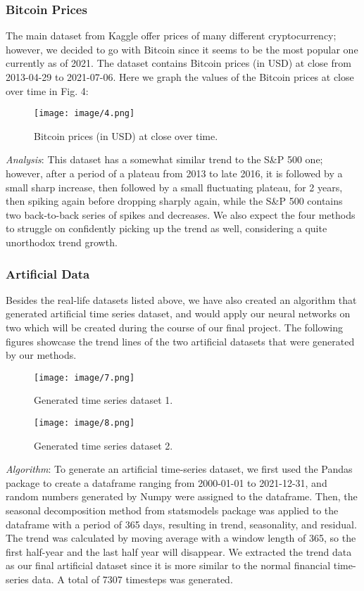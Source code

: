 \documentclass[letterpaper, 10 pt, conference]{ieeeconf}  %
\begin{document}
        \subsubsection{Bitcoin Prices} The main dataset from Kaggle offer prices of many different cryptocurrency; however, we decided to go with Bitcoin since it seems to be the most popular one currently as of 2021. The dataset contains Bitcoin prices (in USD) at close from 2013-04-29 to 2021-07-06. Here we graph the values of the Bitcoin prices at close over time in Fig. 4:

        \begin{figure}[thpb]
            \centering
              \texttt{[image: image/4.png]}
            \caption{Bitcoin prices (in USD) at close over time.}
            \label{figurelabel}
        \end{figure}

        \textit{Analysis}: This dataset has a somewhat similar trend to the S\&P 500 one; however, after a period of a plateau from 2013 to late 2016, it is followed by a small sharp increase, then followed by a small fluctuating plateau, for 2 years, then spiking again before dropping sharply again, while the S\&P 500 contains two back-to-back series of spikes and decreases. We also expect the four methods to struggle on confidently picking up the trend as well, considering a quite unorthodox trend growth.

        \subsubsection{Artificial Data} Besides the real-life datasets listed above, we have also created an algorithm that generated artificial time series dataset, and would apply our neural networks on two which will be created during the course of our final project. The following figures showcase the trend lines of the two artificial datasets that were generated by our methods.
        \begin{figure}[thpb]
            \centering
            \texttt{[image: image/7.png]}
            \caption{Generated time series dataset 1.}
            \label{figurelabel}
            \centering
            \texttt{[image: image/8.png]}
            \caption{Generated time series dataset 2.}
            \label{figurelabel}
        \end{figure}

        \textit{Algorithm}: To generate an artificial time-series dataset, we first used the Pandas package to create a dataframe ranging from 2000-01-01 to 2021-12-31,  and random numbers generated by Numpy were assigned to the dataframe. Then, the seasonal decomposition method from statsmodels package was applied to the dataframe with a period of 365 days, resulting in trend, seasonality, and residual. The trend was calculated by moving average with a window length of 365, so the first half-year and the last half year will disappear. We extracted the trend data as our final artificial dataset since it is more similar to the normal financial time-series data. A total of 7307 timesteps was generated.
\end{document}
